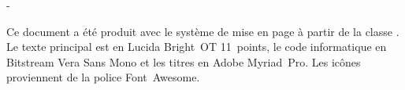 \thispagestyle{empty}
\vspace*{\fill}

\begingroup
\calccentering{\unitlength}
\begin{adjustwidth*}{\unitlength}{-\unitlength}
  \begin{flushleft}
    \small %
    Ce document a été produit avec le système de mise en page
    {\XeLaTeX} à partir de la classe . Le texte
    principal est en Lucida Bright~OT 11~points, le code informatique
    en Bitstream Vera Sans Mono et les titres en Adobe Myriad~Pro. Les
    icônes proviennent de la police Font~Awesome.
  \end{flushleft}
\end{adjustwidth*}
\endgroup
\vfill

